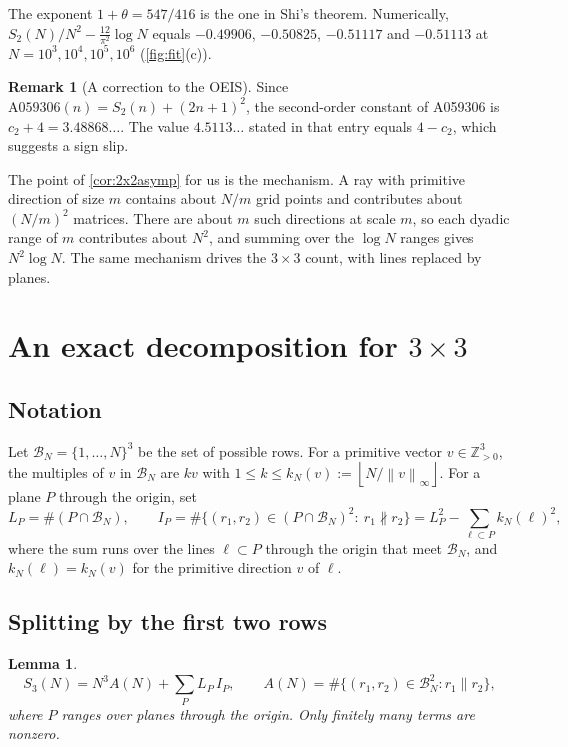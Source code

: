 \documentclass[11pt]{article}
\newtheorem{lemma}[theorem]{Lemma}
\theoremstyle{definition}
\newtheorem{remark}[theorem]{Remark}
\newcommand{\Z}{\mathbb{Z}}
\newcommand{\BN}{\mathcal{B}_N}
\newcommand{\floor}[1]{\left\lfloor #1 \right\rfloor}
\newcommand{\norm}[1]{\left\lVert #1 \right\rVert}
\begin{document}
The exponent $1+\theta=547/416$ is the one in Shi's theorem. Numerically, $S_2(N)/N^2-\frac{12}{\pi^2}\log N$ equals $-0.49906$, $-0.50825$, $-0.51117$ and $-0.51113$ at $N=10^3,10^4,10^5,10^6$ (\cref{fig:fit}(c)).

\begin{remark}[A correction to the OEIS]
Since $\mathrm{A059306}(n)=S_2(n)+(2n+1)^2$, the second-order constant of A059306 is $c_2+4=3.48868\ldots$. The value $4.5113\ldots$ stated in that entry equals $4-c_2$, which suggests a sign slip.
\end{remark}

The point of \cref{cor:2x2asymp} for us is the mechanism. A ray with primitive direction of size $m$ contains about $N/m$ grid points and contributes about $(N/m)^2$ matrices. There are about $m$ such directions at scale $m$, so each dyadic range of $m$ contributes about $N^2$, and summing over the $\log N$ ranges gives $N^2\log N$. The same mechanism drives the $3\times3$ count, with lines replaced by planes.

\section{An exact decomposition for \texorpdfstring{$3\times 3$}{3x3}}\label{sec:decomp}

\subsection{Notation}
Let $\BN=\{1,\dots,N\}^3$ be the set of possible rows. For a primitive vector $v\in\Z_{>0}^3$, the multiples of $v$ in $\BN$ are $kv$ with $1\le k\le k_N(v):=\floor{N/\norm{v}_\infty}$. For a plane $P$ through the origin, set
\[
L_P=\#(P\cap\BN),\qquad
I_P=\#\{(r_1,r_2)\in(P\cap\BN)^2:\ r_1\nparallel r_2\}=L_P^2-\sum_{\ell\subset P}k_N(\ell)^2,
\]
where the sum runs over the lines $\ell\subset P$ through the origin that meet $\BN$, and $k_N(\ell)=k_N(v)$ for the primitive direction $v$ of $\ell$.

\subsection{Splitting by the first two rows}

\begin{lemma}\label{lem:split}
\[
S_3(N)=N^3A(N)+\sum_{P}L_P\,I_P,\qquad A(N)=\#\{(r_1,r_2)\in\BN^2: r_1\parallel r_2\},
\]
where $P$ ranges over planes through the origin. Only finitely many terms are nonzero.
\end{lemma}
\end{document}

